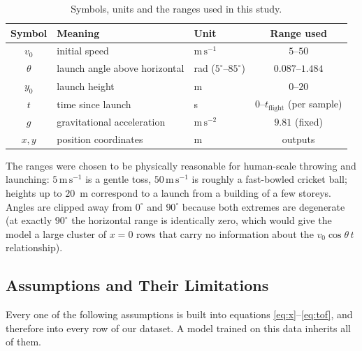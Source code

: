 \documentclass[11pt,a4paper]{article}
\newcommand{\vzero}{v_{0}}
\newcommand{\yzero}{y_{0}}
\newcommand{\ms}{\,\mathrm{m\,s^{-1}}}
\begin{document}
\begin{table}[h]
\centering
\small
\caption{Symbols, units and the ranges used in this study.}
\begin{tabular}{@{}cllc@{}}
\toprule
\textbf{Symbol} & \textbf{Meaning} & \textbf{Unit} & \textbf{Range used} \\
\midrule
$\vzero$ & initial speed                 & $\mathrm{m\,s^{-1}}$ & $5$--$50$ \\
$\theta$ & launch angle above horizontal & rad ($5^\circ$--$85^\circ$) & $0.087$--$1.484$ \\
$\yzero$ & launch height                 & m & $0$--$20$ \\
$t$      & time since launch             & s & $0$--$t_{\text{flight}}$ (per sample) \\
$g$      & gravitational acceleration    & $\mathrm{m\,s^{-2}}$ & $9.81$ (fixed) \\
$x,y$    & position coordinates          & m & outputs \\
\bottomrule
\end{tabular}
\end{table}

The ranges were chosen to be physically reasonable for human-scale throwing and launching: $5\ms$
is a gentle toss, $50\ms$ is roughly a fast-bowled cricket ball; heights up to $20$~m correspond to
a launch from a building of a few storeys. Angles are clipped away from $0^\circ$ and $90^\circ$
because both extremes are degenerate (at exactly $90^\circ$ the horizontal range is identically
zero, which would give the model a large cluster of $x=0$ rows that carry no information about the
$\vzero\cos\theta\,t$ relationship).

\subsection{Assumptions and Their Limitations}\label{sec:assumptions}

Every one of the following assumptions is built into equations \eqref{eq:x}--\eqref{eq:tof}, and
therefore into every row of our dataset. A model trained on this data inherits all of them.
\end{document}
